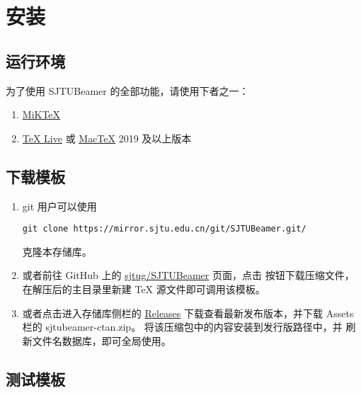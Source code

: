 \documentclass[
    UTF8,
    heading=true,
    12pt,
    a4paper
]{ctexrep}
\def\themename{\textsf{SJTUBeamer}}
\begin{document}
\chapter{安装}

\section{运行环境}

为了使用 \themename{} 的全部功能，请使用下者之一：
\begin{enumerate}
  \item \href{https://mirrors.sjtug.sjtu.edu.cn/
          ctan/systems/win32/miktex/setup/windows
          -x64/}{MiK\TeX{}}
  \item \href{https://mirrors.sjtug.sjtu.edu.cn/
          ctan/systems/texlive/Images/}
        {\TeX{} Live} 或
        \href{https://mirrors.sjtug.sjtu.edu.cn/
          ctan/systems/mac/mactex/}
        {Mac\TeX{}} 2019 及以上版本
\end{enumerate}

\section{下载模板}

\begin{enumerate}
  \item git 用户可以使用
        \begin{verbatim}
git clone https://mirror.sjtu.edu.cn/git/SJTUBeamer.git/
        \end{verbatim}
        克隆本存储库。
  \item 或者前往 GitHub 上的
        \faGithub{}
        \href{https://github.com/sjtug/
          SJTUBeamer}{sjtug/SJTUBeamer} 页面，点击
        按钮下载压缩文件，在解压后的主目录里新建 \TeX{}
        源文件即可调用该模板。
  \item 或者点击进入存储库侧栏的
        \href{https://github.com/sjtug/
          SJTUBeamer/releases}{\textsf{Releases}}
        下载查看最新发布版本，并下载 \textsf{Assets} 栏的
        \textsf{sjtubeamer-ctan.zip}。
        将该压缩包中的内容安装到发行版路径中，并
        刷新文件名数据库，即可全局使用。
\end{enumerate}

\section{测试模板}
\end{document}
